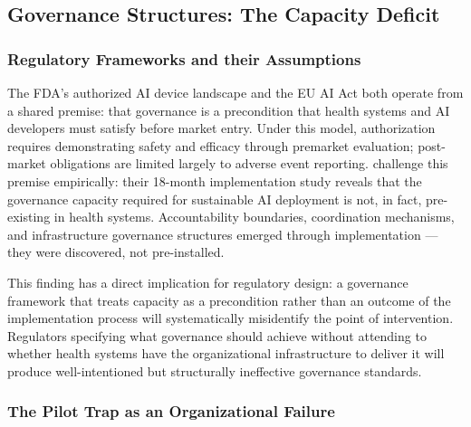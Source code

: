 \subsection{Governance Structures: The Capacity Deficit}
\label{sec:results_governance}


\subsubsection{Regulatory Frameworks and their Assumptions}
\label{sec:gov_regulatory}

The FDA's authorized AI device landscape \citep{warraich2024fda} and the EU
AI Act both operate from a shared premise: that governance is a precondition
that health systems and AI developers must satisfy before market entry.
Under this model, authorization requires demonstrating safety and efficacy
through premarket evaluation; post-market obligations are limited largely to
adverse event reporting. \citet{tian2026pilottrap} challenge this premise
empirically: their 18-month implementation study reveals that the governance
capacity required for sustainable AI deployment is not, in fact, pre-existing
in health systems. Accountability boundaries, coordination mechanisms, and
infrastructure governance structures emerged through implementation — they
were discovered, not pre-installed.

This finding has a direct implication for regulatory design: a governance
framework that treats capacity as a precondition rather than an outcome of
the implementation process will systematically misidentify the point of
intervention. Regulators specifying what governance should achieve without
attending to whether health systems have the organizational infrastructure
to deliver it will produce well-intentioned but structurally ineffective
governance standards.


\subsubsection{The Pilot Trap as an Organizational Failure}
\label{sec:gov_pilottrap}

